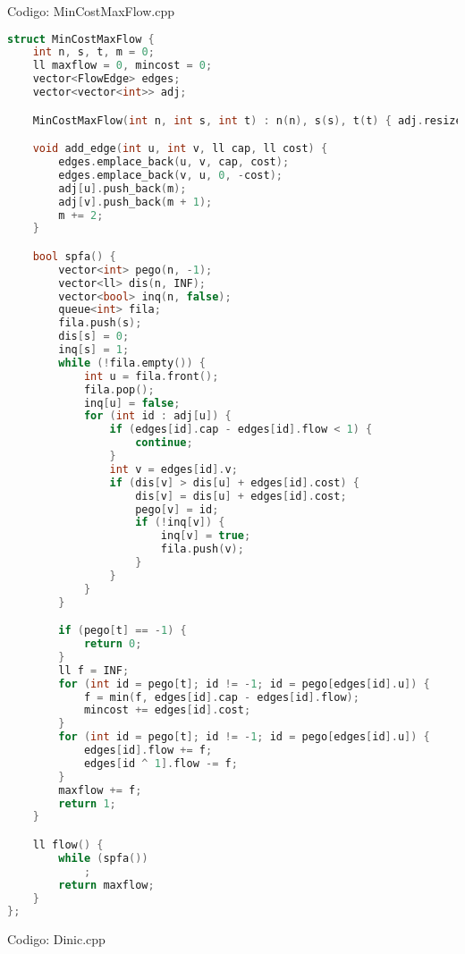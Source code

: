 \documentclass[10pt, a4paper, oneside]{book}
\begin{document}
Codigo: MinCostMaxFlow.cpp

\begin{lstlisting}[language=C++]
struct MinCostMaxFlow {
    int n, s, t, m = 0;
    ll maxflow = 0, mincost = 0;
    vector<FlowEdge> edges;
    vector<vector<int>> adj;

    MinCostMaxFlow(int n, int s, int t) : n(n), s(s), t(t) { adj.resize(n); }

    void add_edge(int u, int v, ll cap, ll cost) {
        edges.emplace_back(u, v, cap, cost);
        edges.emplace_back(v, u, 0, -cost);
        adj[u].push_back(m);
        adj[v].push_back(m + 1);
        m += 2;
    }

    bool spfa() {
        vector<int> pego(n, -1);
        vector<ll> dis(n, INF);
        vector<bool> inq(n, false);
        queue<int> fila;
        fila.push(s);
        dis[s] = 0;
        inq[s] = 1;
        while (!fila.empty()) {
            int u = fila.front();
            fila.pop();
            inq[u] = false;
            for (int id : adj[u]) {
                if (edges[id].cap - edges[id].flow < 1) {
                    continue;
                }
                int v = edges[id].v;
                if (dis[v] > dis[u] + edges[id].cost) {
                    dis[v] = dis[u] + edges[id].cost;
                    pego[v] = id;
                    if (!inq[v]) {
                        inq[v] = true;
                        fila.push(v);
                    }
                }
            }
        }

        if (pego[t] == -1) {
            return 0;
        }
        ll f = INF;
        for (int id = pego[t]; id != -1; id = pego[edges[id].u]) {
            f = min(f, edges[id].cap - edges[id].flow);
            mincost += edges[id].cost;
        }
        for (int id = pego[t]; id != -1; id = pego[edges[id].u]) {
            edges[id].flow += f;
            edges[id ^ 1].flow -= f;
        }
        maxflow += f;
        return 1;
    }

    ll flow() {
        while (spfa())
            ;
        return maxflow;
    }
};
\end{lstlisting}
\hfill

Codigo: Dinic.cpp
\end{document}
